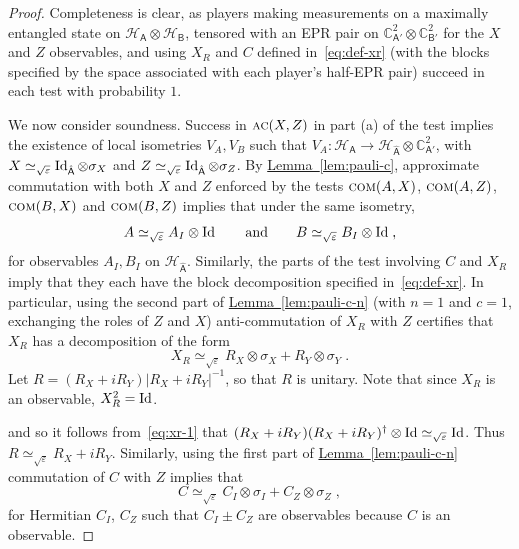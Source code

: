 \documentclass[11pt]{article}
\numberwithin{equation}{section}
\theoremstyle{definition}
\theoremstyle{plain}
\newcommand{\C}{\mathbb C}
\newcommand{\expref}[2]{\hyperref[#2]{#1~\ref{#2}}}
\newcommand{\Id}{\ensuremath{\mathop{\rm Id}\nolimits}}
\newcommand{\reg}[1]{{\textsf{#1}}}
\newcommand{\mH}{\mathcal{H}}
\newcommand{\eps}{\varepsilon}
\newcommand{\comt}{\textsc{com}}
\newcommand{\act}{\textsc{ac}}
\begin{document}
\begin{proof}
Completeness is clear, as players making measurements on a maximally entangled state on $\mH_{\reg{A}}\otimes \mH_{\reg{B}}$, tensored with an EPR pair on $\C^2_{\reg{A}'} \otimes \C^2_{\reg{B}'}$ for the $X$ and $Z$ observables, and using $X_R$ and $C$ defined in~\eqref{eq:def-xr} (with the blocks specified by the space associated with each player's half-EPR pair) succeed in each test with probability $1$. 

We now consider soundness. Success in $\act(X,Z)$ in part (a) of the test implies the existence of local isometries $V_A,V_B$ such that $V_A:\mH_\reg{A}\to \mH_{\hat{\reg{A}}}\otimes \C^2_{\reg{A}'}$, with $X\simeq_{\sqrt{\eps}} \Id_{\hat{\reg{A}}}\otimes \sigma_X$ and $Z\simeq_{\sqrt{\eps}} \Id_{\hat{\reg{A}}}\otimes\sigma_Z$. By \expref{Lemma}{lem:pauli-c}, approximate commutation with both $X$ and $Z$ enforced by the tests $\comt(A,X)$, $\comt(A,Z)$, $\comt(B,X)$ and $\comt(B,Z)$ implies that under the same isometry, 
\begin{equation}\label{eq:cliff-2c}
A\simeq_{\sqrt{\eps}} A_I \otimes \Id\qquad\text{and}\qquad B\simeq_{\sqrt{\eps}} B_I \otimes \Id\;,
\end{equation}
 for observables $A_I, B_I$ on $\mH_{\hat{\reg{A}}}$. Similarly, the parts of the test involving $C$ and $X_R$ imply that they each have the block decomposition specified in~\eqref{eq:def-xr}. 
In particular, using the second part of \expref{Lemma}{lem:pauli-c-n} (with $n=1$ and $c=1$, exchanging the roles of $Z$ and $X$) anti-commutation of $X_R$ with $Z$ certifies that $X_R$ has  a decomposition of the form  
\begin{equation}\label{eq:xr-1}
X_R \simeq_{\sqrt{\eps}} R_X \otimes \sigma_X + R_Y \otimes \sigma_Y\;.
\end{equation}
Let $R = ( R_X + i R_Y)| R_X + i R_Y|^{-1}$, so that $R$ is unitary. Note that since $X_R$ is an observable, $X_R^2=\Id$. 


 and so it follows from~\eqref{eq:xr-1} that $(R_X+iR_Y)(R_X+iR_Y)^\dagger \otimes \Id \simeq_{\sqrt{\eps}} \Id$. Thus $R \simeq_{\sqrt{\eps}} R_X + i R_Y$. 
 Similarly, using the first part of \expref{Lemma}{lem:pauli-c-n} commutation of $C$ with $Z$ implies that 
\begin{equation}\label{clif-2ab}
C \simeq_{\sqrt{\eps}} C_I \otimes \sigma_I + C_Z \otimes \sigma_Z\;,
\end{equation}
 for Hermitian $C_I$, $C_Z$ such that $C_I \pm C_Z$ are observables because $C$ is an observable. 


\end{proof}
\end{document}
